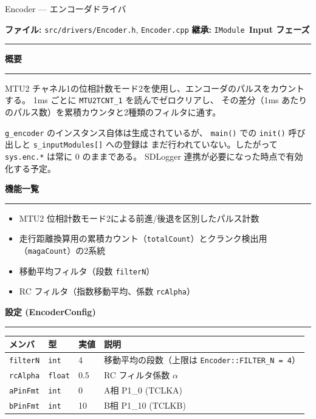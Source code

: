 \documentclass[a4paper,11pt,dvipdfmx]{jsarticle}
\makeatletter
\newcommand{\apisection}[1]{%
  \par\addvspace{4mm}%
  {\normalsize\bfseries\color{headerblue} #1}%
  \par\vspace{-1mm}%
  {\color{accentblue!40}\rule{\linewidth}{0.5pt}}%
  \par\nobreak\vspace{2mm}%
  \@afterheading
}
\newcommand{\phasebadge}[1]{%
  \colorbox{accentblue!10}{\small\bfseries\color{accentblue!80!black}\,#1\,}%
}
\makeatother
\begin{document}
\begin{apibox}{Encoder --- エンコーダドライバ}

\textbf{ファイル:} \texttt{src/drivers/Encoder.h}, \texttt{Encoder.cpp} \hfill
\textbf{継承:} \texttt{IModule} \hfill
\phasebadge{Input フェーズ}

\vspace{2mm}\hrule\vspace{2mm}

\apisection{概要}

MTU2 チャネル1の位相計数モード2を使用し、エンコーダのパルスをカウントする。
1ms ごとに \texttt{MTU2TCNT\_1} を読んでゼロクリアし、
その差分（1ms あたりのパルス数）を累積カウンタと2種類のフィルタに通す。

\begin{cautionbox}
\texttt{g\_encoder} のインスタンス自体は生成されているが、
\texttt{main()} での \texttt{init()} 呼び出しと \texttt{s\_inputModules[]} への登録は
まだ行われていない。したがって \texttt{sys.enc.*} は常に 0 のままである。
SDLogger 連携が必要になった時点で有効化する予定。
\end{cautionbox}

\apisection{機能一覧}

\begin{itemize}[nosep]
  \item MTU2 位相計数モード2による前進/後退を区別したパルス計数
  \item 走行距離換算用の累積カウント（\texttt{totalCount}）とクランク検出用（\texttt{magaCount}）の2系統
  \item 移動平均フィルタ（段数 \texttt{filterN}）
  \item RC フィルタ（指数移動平均、係数 \texttt{rcAlpha}）
\end{itemize}

\apisection{設定 (EncoderConfig)}

\begin{tabularx}{\textwidth}{l l l X}
\toprule
\textbf{メンバ} & \textbf{型} & \textbf{実値} & \textbf{説明} \\
\midrule
\texttt{filterN}  & \texttt{int}   & 4    & 移動平均の段数（上限は \texttt{Encoder::FILTER\_N = 4}） \\
\texttt{rcAlpha}  & \texttt{float} & 0.5  & RC フィルタ係数 $\alpha$ \\
\texttt{aPinFmt}  & \texttt{int}   & 0    & A相 P1\_0 (TCLKA) \\
\texttt{bPinFmt}  & \texttt{int}   & 10   & B相 P1\_10 (TCLKB) \\
\bottomrule
\end{tabularx}


\end{apibox}
\end{document}
